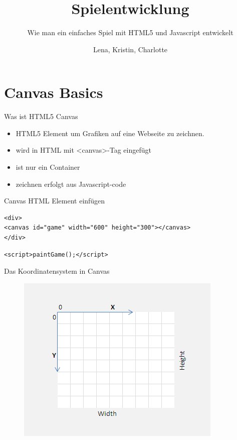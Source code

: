 \documentclass[18pt]{beamer}
\title[Javascript Basics]{Spielentwicklung}
\subtitle{Wie man ein einfaches Spiel mit HTML5 und Javascript entwickelt}
\author{Lena, Kristin, Charlotte}
\begin{document}

\begin{frame}
\titlepage
\end{frame}

\section{Canvas Basics}

\begin{frame}[fragile]{Was ist HTML5 Canvas}
\begin{itemize}
	\item HTML5 Element um Grafiken auf eine Webseite zu zeichnen. 
	\item wird in HTML mit \textless canvas\textgreater  -Tag eingefügt 
	\item ist nur ein Container 
	\item zeichnen erfolgt aus Javascript-code
\end{itemize}
\end{frame}

\begin{frame}[fragile]{Canvas HTML Element einfügen}
\begin{lstlisting}
<div>
<canvas id="game" width="600" height="300"></canvas>
</div>
\end{lstlisting}
\begin{lstlisting}
<script>paintGame();</script>
\end{lstlisting}
\end{frame}

\begin{frame}{Das Koordinatensystem in Canvas}
\begin{figure}[htb]
	\centering
	\includegraphics{logos/canvascos}
\end{figure}
\end{frame}
\end{document}
